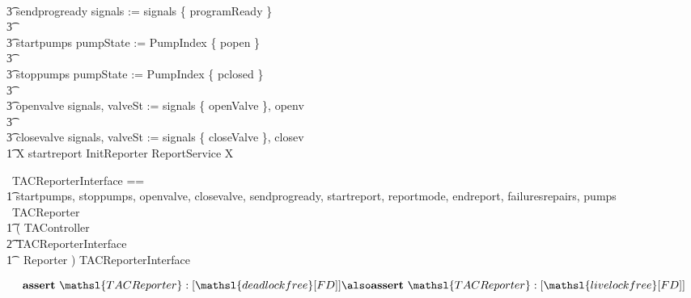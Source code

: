 \documentclass{report} %
\begin{document}
\begin{circus}
                    \\ %
                    \t3 sendprogready \then signals := signals \cup \{ programReady \}
                    \\ %
                    \t3 \extchoice
                    \\ %
                    \t3 startpumps \then pumpState := PumpIndex \cross \{ popen \}
                    \\ %
                    \t3 \extchoice
                    \\ %
                    \t3 stoppumps \then pumpState := PumpIndex \cross \{ pclosed \}
                    \\ %
                    \t3 \extchoice
                    \\ %
                    \t3 openvalve \then signals, valveSt := signals \cup \{ openValve \}, openv 
                    \\ %
                    \t3 \extchoice
                    \\ %
                    \t3 closevalve \then signals, valveSt := signals \cup \{ closeValve \}, closev \\
        \t1 \circspot \circmu X \circspot startreport \then \lschexpract InitReporter \rschexpract \circseq ReportService \circseq X \\
        \circend
\end{circus}

\begin{circus}

   \circchannelset\ TACReporterInterface == \\
        \t1 \lchanset startpumps, stoppumps, openvalve, closevalve, sendprogready, startreport, reportmode, endreport, failuresrepairs, pumps \rchanset  \\

   \circprocess\ TACReporter \circdef \\
    \t1 ( TAController \\
        \t2 \lpar TACReporterInterface \rpar \\
        \t1\ \ Reporter ) \circhide TACReporterInterface
\end{circus}
\[
  \mathbf{assert}\ \mathsl{TACReporter} :[ \mathsl{deadlock free } [FD] ]
  \also %
  \mathbf{assert}\ \mathsl{TACReporter} :[ \mathsl{livelock free } [FD] ]
\]
\end{document}
